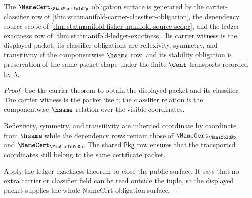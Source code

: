 \begin{theorem}
\label{thm:statmanifold-namecert-obligation-surface}
The $\NameCert_{\StatManifoldUp}$ obligation surface is generated by the
carrier-classifier row of
\autoref{thm:statmanifold-carrier-classifier-obligation}, the dependency
source scope of
\autoref{thm:statmanifold-fisher-manifold-source-scope}, and the ledger
exactness row of \autoref{thm:statmanifold-ledger-exactness}. Its carrier
witness is the displayed packet, its classifier obligations are reflexivity,
symmetry, and transitivity of the componentwise $\hsame$ row, and its
stability obligation is preservation of the same packet shape under the
finite $\Cont$ transports recorded by $\lambda$.
\end{theorem}
\begin{proof}
Use the carrier theorem to obtain the displayed packet and its classifier.
The carrier witness is the packet itself; the classifier relation is the
componentwise $\hsame$ relation over the visible coordinates.

Reflexivity, symmetry, and transitivity are inherited coordinate by
coordinate from $\hsame$ while the dependency rows remain those of
$\NameCert_{\ManifoldUp}$ and $\NameCert_{\FisherInfoUp}$. The shared
$\mathsf{Pkg}$ row ensures that the transported coordinates still belong to
the same certificate packet.

Apply the ledger exactness theorem to close the public surface. It says that
no extra carrier or classifier field can be read outside the tuple, so the
displayed packet supplies the whole NameCert obligation surface.
\end{proof}

